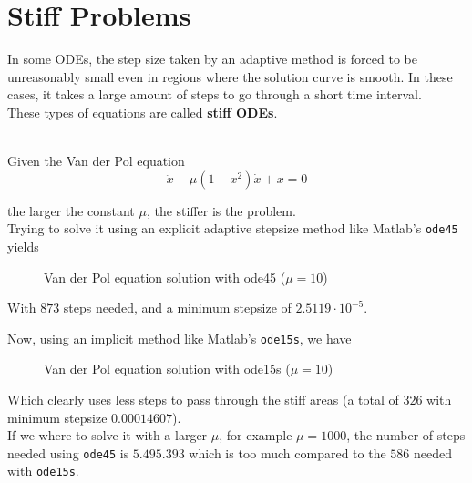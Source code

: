\section{Stiff Problems}

In some ODEs, the step size taken by an adaptive method is forced to be unreasonably small even in regions where the solution curve is smooth. In these cases, it takes a large amount of steps to go through a short time interval.\\

These types of equations are called \textbf{stiff ODEs}.

\begin{example}\-\\
Given the Van der Pol equation $$\ddot{x} - \mu(1-x^2)\dot{x} + x = 0$$

the larger the constant $\mu$, the stiffer is the problem. \\

Trying to solve it using an explicit adaptive stepsize method like Matlab's \texttt{ode45} yields


\begin{figure}[h]
  \centering
  
  \caption{Van der Pol equation solution with ode45 ($\mu = 10$)}
\end{figure}

With $873$ steps needed, and a minimum stepsize of $2.5119\cdot 10^{-5}$.\\

\newpage

Now, using an implicit method like Matlab's \texttt{ode15s}, we have

\begin{figure}[h]
  \centering
  
  \caption{Van der Pol equation solution with ode15s ($\mu = 10$)}
\end{figure}

Which clearly uses less steps to pass through the stiff areas (a total of $326$ with minimum stepsize $0.00014607$).\\

If we where to solve it with a larger $\mu$, for example $\mu = 1000$, the number of steps needed using \texttt{ode45} is $5.495.393$ which is too much compared to the $586$ needed with \texttt{ode15s}.\\

\end{example}

\newpage

